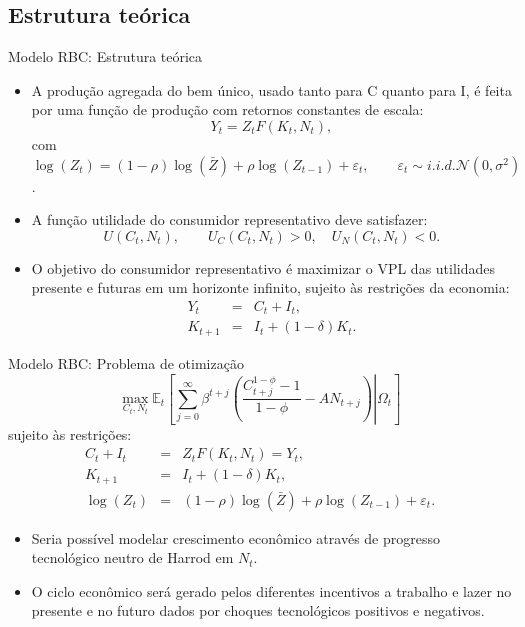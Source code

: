 \documentclass[10pt]{beamer}
\begin{document}
\subsection{Estrutura teórica}
\begin{frame}{Modelo RBC: Estrutura teórica}
    \begin{itemize}
        \item A produção agregada do bem único, usado tanto para C quanto para I, é
feita por uma função de produção com retornos constantes de escala:
\begin{equation}
    Y_t = Z_t F(K_t, N_t),
    \label{eq1}
\end{equation}
com $\log(Z_{t}) = (1-\rho)\log(\bar{Z}) + \rho \log(Z_{t-1}) + \varepsilon_t, \qquad \varepsilon_t \sim i.i.d. \mathcal{N}(0, \sigma^2)$.
\bigskip
\item A função utilidade do consumidor representativo deve satisfazer:
\begin{equation*}
    U(C_t, N_t), \qquad U_C(C_t, N_t) > 0, \quad U_N(C_t, N_t) < 0.
\end{equation*}
\bigskip
    \item O objetivo do consumidor representativo é maximizar o VPL das utilidades presente e futuras em um horizonte infinito, sujeito às restrições da economia:
    \begin{eqnarray*}
    Y_t &=& C_t + I_t, \\
    K_{t+1} &=& I_t + (1-\delta)K_t.
    \end{eqnarray*}
    \end{itemize}
\end{frame}

\begin{frame}{Modelo RBC: Problema de otimização}
    \begin{equation}
        \max_{C_t, N_t} \mathbb{E}_t\left[\sum_{j=0}^\infty \beta^{t+j} \left(\left. \frac{C_{t+j}^{1-\phi}-1}{1-\phi} - AN_{t+j}\right) \right| \Omega_t \right]
        \label{eq2}
    \end{equation}
    sujeito às restrições:
    \begin{eqnarray}
    C_t + I_t &=& Z_tF(K_t, N_t) = Y_t, \nonumber \\
    K_{t+1} &=& I_t + (1-\delta)K_t, \label{eq3} \\
    \log(Z_t) &=& (1-\rho)\log(\bar{Z}) + \rho \log (Z_{t-1}) + \varepsilon_t. \nonumber
    \end{eqnarray}
    \bigskip
    \begin{itemize}
        \item Seria possível modelar crescimento econômico através de progresso tecnológico neutro de Harrod em $N_t$.
        \bigskip
        \item O ciclo econômico será gerado pelos diferentes incentivos a trabalho e
lazer no presente e no futuro dados por choques tecnológicos
positivos e negativos.
    \end{itemize}
\end{frame}
\end{document}

